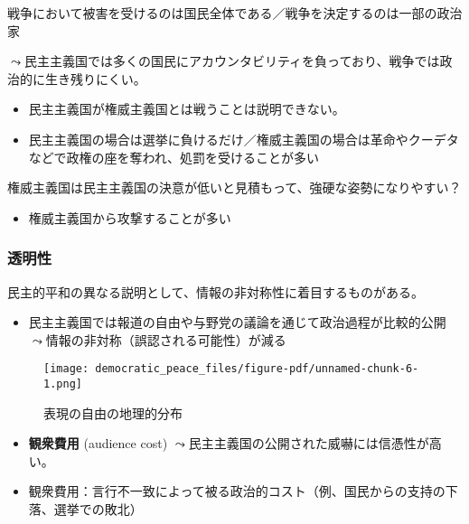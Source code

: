 \documentclass[
  xelatex,
  ja=standard]{bxjsarticle}
\providecommand{\tightlist}{%
  \setlength{\itemsep}{0pt}\setlength{\parskip}{0pt}}\usepackage{longtable,booktabs,array}
\begin{document}
戦争において被害を受けるのは国民全体である／戦争を決定するのは一部の政治家

\(\leadsto\)民主主義国では多くの国民にアカウンタビリティを負っており、戦争では政治的に生き残りにくい。

\begin{itemize}
\tightlist
\item
  民主主義国が権威主義国とは戦うことは説明できない。
\item
  民主主義国の場合は選挙に負けるだけ／権威主義国の場合は革命やクーデタなどで政権の座を奪われ、処罰を受けることが多い\citep{goemans2008}
\end{itemize}

権威主義国は民主主義国の決意が低いと見積もって、強硬な姿勢になりやすい？

\begin{itemize}
\tightlist
\item
  権威主義国から攻撃することが多い\citep{reiter2003}
\end{itemize}

\hypertarget{ux900fux660eux6027}{%
\subsubsection{透明性}\label{ux900fux660eux6027}}

民主的平和の異なる説明として、情報の非対称性に着目するものがある。

\begin{itemize}
\tightlist
\item
  民主主義国では報道の自由\citep{van1997}や与野党の議論\citep{schultz1998}を通じて政治過程が比較的公開\(\leadsto\)情報の非対称（誤認される可能性）が減る
\end{itemize}

\begin{figure}[htpb]

{\centering \texttt{[image: democratic\_peace\_files/figure-pdf/unnamed-chunk-6-1.png]}

}

\caption{表現の自由の地理的分布}

\end{figure}

\begin{itemize}
\tightlist
\item
  \textbf{観衆費用} (audience cost)
  \(\leadsto\)民主主義国の公開された威嚇には信憑性が高い\citep{fearon1994}。
\item
  観衆費用：言行不一致によって被る政治的コスト（例、国民からの支持の下落、選挙での敗北）
\end{itemize}
\end{document}
